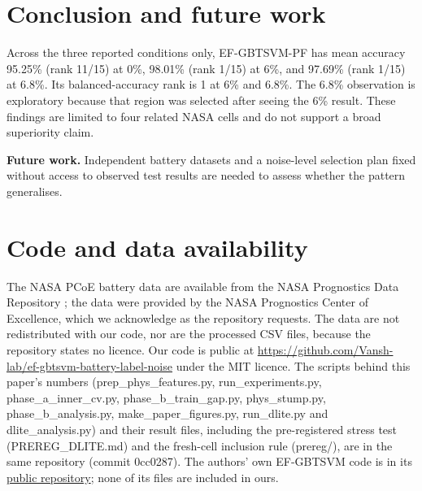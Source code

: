 \documentclass[conference,a4paper]{IEEEtran}
\begin{document}
\section{Conclusion and future work}

Across the three reported conditions only, EF-GBTSVM-PF has mean accuracy 95.25\% (rank 11/15) at 0\%, 98.01\% (rank 1/15) at 6\%, and 97.69\% (rank 1/15) at 6.8\%. Its balanced-accuracy rank is 1 at 6\% and 6.8\%. The 6.8\% observation is exploratory because that region was selected after seeing the 6\% result. These findings are limited to four related NASA cells and do not support a broad superiority claim.

\textbf{Future work.} Independent battery datasets and a noise-level selection plan fixed without access to observed test results are needed to assess whether the pattern generalises.

\section*{Code and data availability}

The NASA PCoE battery data are available from the NASA Prognostics Data Repository \cite{r10}; the data were provided by the NASA Prognostics Center of Excellence, which we acknowledge as the repository requests. The data are not redistributed with our code, nor are the processed CSV files, because the repository states no licence. Our code is public at \href{https://github.com/Vansh-lab/ef-gbtsvm-battery-label-noise}{https://github.com/Vansh-lab/ef-gbtsvm-battery-label-noise} under the MIT licence. The scripts behind this paper's numbers (prep\_phys\_features.py, run\_experiments.py, phase\_a\_inner\_cv.py, phase\_b\_train\_gap.py, phys\_stump.py, phase\_b\_analysis.py, make\_paper\_figures.py, run\_dlite.py and dlite\_analysis.py) and their result files, including the pre-registered stress test (PREREG\_DLITE.md) and the fresh-cell inclusion rule (prereg/), are in the same repository (commit 0cc0287). The authors' own EF-GBTSVM code is in its \href{https://github.com/mtanveer1/EF-GBTSVM}{public repository}; none of its files are included in ours.

\clearpage
\clearpage
\end{document}

